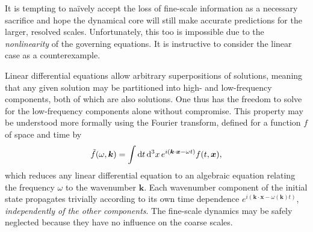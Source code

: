 \documentclass[titlepage]{article}
\numberwithin{equation}{section}
\renewcommand{\d}[1]{\mathrm{d}#1}
\renewcommand\vec{\bm}
\begin{document}
It is tempting to na\"{i}vely accept the loss of fine-scale information as a
necessary sacrifice and hope the dynamical core will still make accurate
predictions for the larger, resolved scales. Unfortunately, this too is
impossible due to the \emph{nonlinearity} of the governing equations. It is
instructive to consider the linear case as a counterexample.

Linear differential equations allow arbitrary superpositions of solutions,
meaning that any given solution may be partitioned into high- and low-frequency
components, both of which are also solutions. One thus has the freedom to solve
for the low-frequency components alone without compromise. This property may be
understood more formally using the Fourier transform, defined for a function
$f$ of space and time by
\[
    \tilde{f}(\omega, \vec{k})
        = \int \d{t}\,\d^3{x}\, e^{i(\vec{k} \cdot \vec{x} - \omega t)}
        f(t, \vec{x}),
\]
which reduces any linear differential equation to an algebraic equation
relating the frequency $\omega$ to the wavenumber $\vec{k}$. Each wavenumber
component of the initial state propagates trivially according to its own
time dependence $e^{i(\vec{k} \cdot \vec{x} - \omega(\vec{k}) t)}$,
\emph{independently of the other components}. The fine-scale dynamics may
be safely neglected because they have no influence on the coarse scales.
\end{document}
